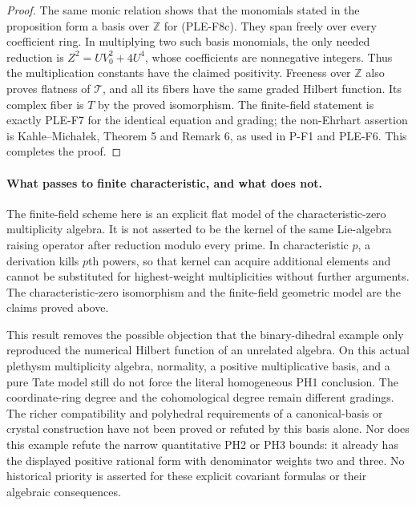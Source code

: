 \documentclass[11pt,a4paper]{article}
\begin{document}
\begin{proof}
The same monic relation shows that the monomials stated in the
proposition form a basis over $\mathbb Z$ for (PLE-F8c).
They span freely over every coefficient ring. In multiplying two
such basis monomials, the only needed reduction is
$Z^2=UV_0^2+4U^4$, whose coefficients are nonnegative integers.
Thus the multiplication constants have the claimed positivity.
Freeness over $\mathbb Z$ also proves flatness of $\mathcal T$,
and all its fibers have the same graded Hilbert function.
Its complex fiber is $T$ by the proved isomorphism. The finite-field
statement is exactly PLE-F7 for the identical equation and grading;
the non-Ehrhart assertion is Kahle--Micha\l ek, Theorem 5 and
Remark 6, as used in P-F1 and PLE-F6. This completes the proof.
\end{proof}

\paragraph{What passes to finite characteristic, and what does not.}
The finite-field scheme here is an explicit flat model of the
characteristic-zero multiplicity algebra. It is not asserted to be
the kernel of the same Lie-algebra raising operator after reduction
modulo every prime. In characteristic $p$, a derivation kills
$p$th powers, so that kernel can acquire additional elements and
cannot be substituted for highest-weight multiplicities without
further arguments. The characteristic-zero isomorphism and the
finite-field geometric model are the claims proved above.

This result removes the possible objection that the binary-dihedral
example only reproduced the numerical Hilbert function of an
unrelated algebra. On this actual plethysm multiplicity algebra,
normality, a positive multiplicative basis, and a pure Tate model
still do not force the literal homogeneous PH1 conclusion.
The coordinate-ring degree and the cohomological degree remain
different gradings. The richer compatibility and polyhedral
requirements of a canonical-basis or crystal construction have not
been proved or refuted by this basis alone. Nor does this example
refute the narrow quantitative PH2 or PH3 bounds: it already has
the displayed positive rational form with denominator weights two
and three. No historical priority is asserted for these explicit
covariant formulas or their algebraic consequences.


\end{document}

